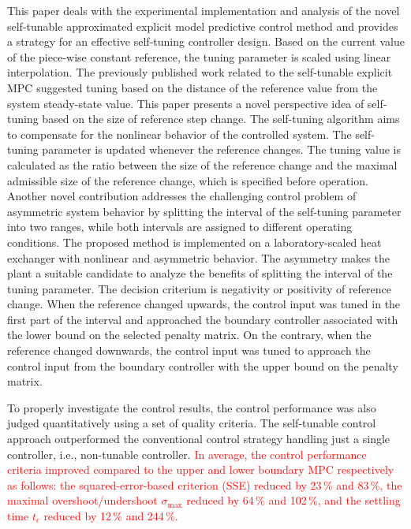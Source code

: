 \documentclass[preprint,12pt]{elsarticle}
\begin{document}
	This paper deals with the experimental implementation and analysis of the novel self-tunable approximated explicit model predictive control method and provides a strategy for an effective self-tuning controller design. Based on the current value of the piece-wise constant reference, the tuning parameter is scaled using linear interpolation. 
	The previously published work related to the self-tunable explicit MPC suggested tuning based on the distance of the reference value from the system steady-state value. This paper presents a novel perspective idea of self-tuning based on the size of reference step change. The self-tuning algorithm aims to compensate for the nonlinear behavior of the controlled system. The self-tuning parameter is updated whenever the reference changes. The tuning value is calculated as the ratio between the size of the reference change and the maximal admissible size of the reference change, which is specified before operation. 
	Another novel contribution addresses the challenging control problem of asymmetric system behavior by splitting the interval of the self-tuning parameter into two ranges, while both intervals are assigned to different operating conditions. The proposed method is implemented on a laboratory-scaled heat exchanger with nonlinear and asymmetric behavior. The asymmetry makes the plant a suitable candidate to analyze the benefits of splitting the interval of the tuning parameter. The decision criterium is negativity or positivity of reference change. When the reference changed upwards, the control input was tuned in the first part of the interval and approached the boundary controller associated with the lower bound on the selected penalty matrix. On the contrary, when the reference changed downwards, the control input was tuned to approach the control input from the boundary controller with the upper bound on the penalty matrix. 
	
	To properly investigate the control results, the control performance was also judged quantitatively using a set of quality criteria. The self-tunable control approach outperformed the conventional control strategy handling just a single controller, i.e., non-tunable controller. \textcolor{red}{In average, the control performance criteria improved compared to the upper and lower boundary MPC respectively as follows: the squared-error-based criterion (SSE) reduced by 23\,\% and 83\,\%, the maximal overshoot/undershoot $\sigma_{\mathrm{max}}$ reduced by 64\,\% and 102\,\%, and the settling time $t_{\epsilon}$ reduced by 12\,\% and 244\,\%.}
	
\end{document}
